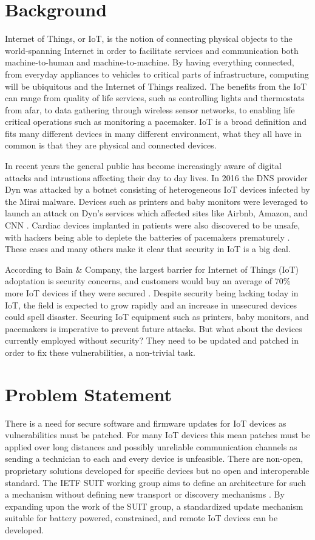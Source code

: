 \documentclass[0-thesis.tex]{subfiles}
\begin{document}
\section{Background}
Internet of Things, or IoT, is the notion of connecting physical objects to the
world-spanning Internet in order to facilitate services and communication both
machine-to-human and machine-to-machine. By having everything connected, from everyday
appliances to vehicles to critical parts of infrastructure, computing will be ubiquitous
and the Internet of Things realized. The benefits from the IoT can range from quality of
life services, such as controlling lights and thermostats from afar, to data gathering
through wireless sensor networks, to enabling life critical operations such as monitoring
a pacemaker. IoT is a broad definition and fits many different devices in many different
environment, what they all have in common is that they are physical and connected devices.

In recent years the general public has become increasingly aware of digital attacks and
intrustions affecting their day to day lives. In 2016 the DNS provider Dyn was attacked by
a botnet consisting of heterogeneous IoT devices infected by the Mirai malware. Devices
such as printers and baby monitors were leveraged to launch an attack on Dyn's services
which affected sites like Airbnb, Amazon, and CNN \parencite{perlroth_2016}. Cardiac
devices implanted in patients were also discovered to be unsafe, with hackers being able
to deplete the batteries of pacemakers prematurely \parencite{hern_2017}. These cases and
many others make it clear that security in IoT is a big deal.

According to Bain \& Company, the largest barrier for Internet of Things (IoT) adoptation
is security concerns, and customers would buy an average of 70\% more IoT devices if they
were secured \parencite{ali_bosche_ford_2018}. Despite security being lacking today in
IoT, the field is expected to grow rapidly and an increase in unsecured devices could
spell disaster. Securing IoT equipment such as printers, baby monitors, and pacemakers is
imperative to prevent future attacks. But what about the devices currently employed
without security? They need to be updated and patched in order to fix these
vulnerabilities, a non-trivial task.

\section{Problem Statement}
There is a need for secure software and firmware updates for IoT devices as
vulnerabilities must be patched. For many IoT devices this mean patches must be applied
over long distances and possibly unreliable communication channels as sending a technician
to each and every device is unfeasible. There are non-open, proprietary solutions
developed for specific devices but no open and interoperable standard. The IETF SUIT
working group aims to define an architecture for such a mechanism without defining new
transport or discovery mechanisms \parencite{suit}. By expanding upon the work of the SUIT
group, a standardized update mechanism suitable for battery powered, constrained, and
remote IoT devices can be developed.
\end{document}

